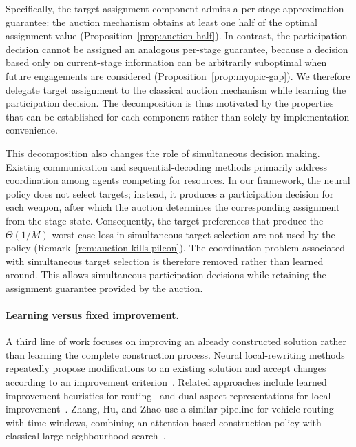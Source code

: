 Specifically, the target-assignment component admits a per-stage approximation guarantee: the auction mechanism obtains at least one half of the optimal assignment value (Proposition~\ref{prop:auction-half}). In contrast, the participation decision cannot be assigned an analogous per-stage guarantee, because a decision based only on current-stage information can be arbitrarily suboptimal when future engagements are considered (Proposition~\ref{prop:myopic-gap}). We therefore delegate target assignment to the classical auction mechanism while learning the participation decision. The decomposition is thus motivated by the properties that can be established for each component rather than solely by implementation convenience.

This decomposition also changes the role of simultaneous decision making. Existing communication and sequential-decoding methods primarily address coordination among agents competing for resources. In our framework, the neural policy does not select targets; instead, it produces a participation decision for each weapon, after which the auction determines the corresponding assignment from the stage state. Consequently, the target preferences that produce the $\Theta(1/M)$ worst-case loss in simultaneous target selection are not used by the policy (Remark~\ref{rem:auction-kills-pileon}). The coordination problem associated with simultaneous target selection is therefore removed rather than learned around. This allows simultaneous participation decisions while retaining the assignment guarantee provided by the auction.

\paragraph{Learning versus fixed improvement.}
A third line of work focuses on improving an already constructed solution rather than learning the complete construction process. Neural local-rewriting methods repeatedly propose modifications to an existing solution and accept changes according to an improvement criterion~\cite{chen2019rewriter}. Related approaches include learned improvement heuristics for routing~\cite{wu2021improvement} and dual-aspect representations for local improvement~\cite{ma2021dact}. Zhang, Hu, and Zhao use a similar pipeline for vehicle routing with time windows, combining an attention-based construction policy with classical large-neighbourhood search~\cite{zhang2025vrptw}.

